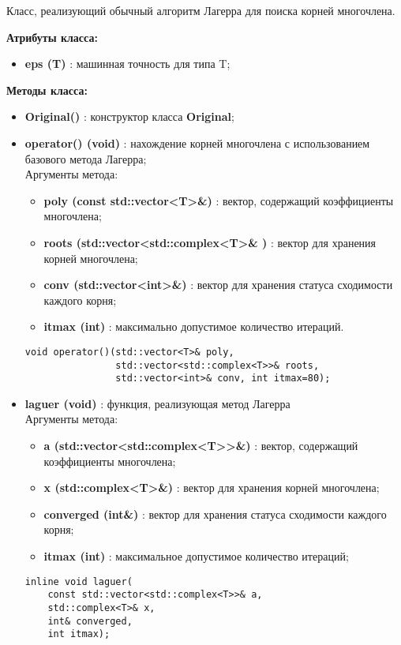 \documentclass[a4paper,12pt]{article}
\begin{document}
Класс, реализующий обычный алгоритм Лагерра для поиска корней многочлена.

\textbf{Атрибуты класса:}
\begin{itemize}
\renewcommand{\labelitemi}{-}
    \item \textbf{eps (T)} : машинная точность для типа T;
\end{itemize}

\textbf{Методы класса:}
\begin{itemize}
    \item \textbf{Original()} : конструктор класса \textbf{Original};
    
    \item \textbf{operator() (void)} : нахождение корней многочлена с использованием базового метода Лагерра;
    \\Аргументы метода:
    \begin{itemize}
        \renewcommand{\labelitemi}{-}
        \item \textbf{poly (const std::vector<T>\&)} : вектор, содержащий коэффициенты многочлена;
        \item \textbf{roots (std::vector<std::complex<T>\& )} : вектор для хранения корней многочлена;
        \item \textbf{conv (std::vector<int>\&)} : вектор для хранения статуса сходимости каждого корня;
        \item \textbf{itmax (int)} : максимально допустимое количество итераций.
    \end{itemize}
    \begin{lstlisting}[language=С++]
void operator()(std::vector<T>& poly, 
                std::vector<std::complex<T>>& roots, 
                std::vector<int>& conv, int itmax=80); \end{lstlisting}
     \item \textbf{laguer (void)} : функция, реализующая метод Лагерра
    \\Аргументы метода:
    \begin{itemize}
        \renewcommand{\labelitemi}{-}
        \item \textbf{a (std::vector<std::complex<T>>\&)} : вектор, содержащий коэффициенты многочлена;
        \item \textbf{x (std::complex<T>\&)} : вектор для хранения корней многочлена;
        \item \textbf{converged (int\&)} : вектор для хранения статуса сходимости каждого корня;
        \item \textbf{itmax (int)} : максимальное допустимое количество итераций;
    \end{itemize}
\begin{lstlisting}[language=С++]
inline void laguer(
    const std::vector<std::complex<T>>& a,
    std::complex<T>& x,
    int& converged,
    int itmax); \end{lstlisting}
    
\end{itemize}
\newpage
\end{document}
